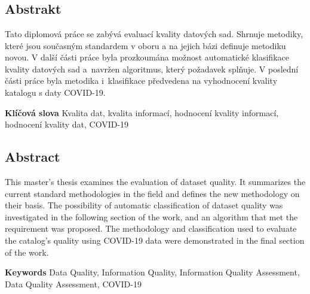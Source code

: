 \chapter*{}

\section*{Abstrakt}

Tato diplomová práce se zabývá evaluací kvality datových sad.
Shrnuje metodiky, které jsou současným standardem v oboru a na jejich bázi definuje metodiku novou.
V další části práce byla prozkoumána možnost automatické klasifikace kvality datových sad a~navržen algoritmus, který požadavek splňuje.
V poslední části práce byla metodika i~klasifikace předvedena na vyhodnocení kvality katalogu s daty COVID-19.

\vspace{5mm}

\textbf{Klíčová slova} Kvalita dat, kvalita informací, hodnocení kvality informací, hodnocení kvality dat, COVID-19

\vspace{20mm}

\section*{Abstract}

This master's thesis examines the evaluation of dataset quality.
It summarizes the current standard methodologies in the field and defines the new methodology on their basis.
The possibility of automatic classification of dataset quality was investigated in the following section of the work, and an algorithm that met the requirement was proposed.
The methodology and classification used to evaluate the catalog's quality using COVID-19 data were demonstrated in the final section of the work.

\vspace{5mm}

\textbf{Keywords} Data Quality, Information Quality, Information Quality Assessment, Data Quality Assessment, COVID-19
